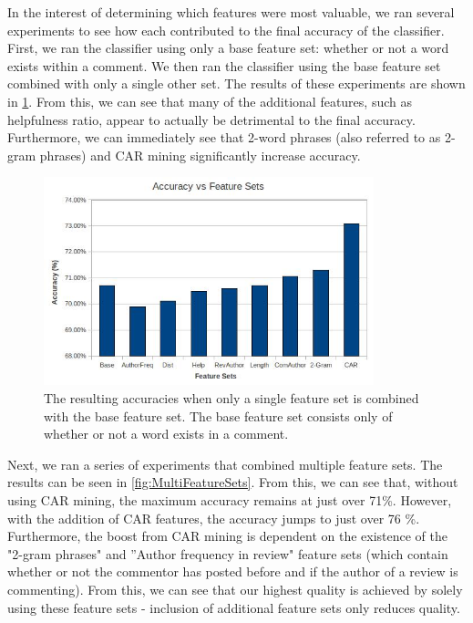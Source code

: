\documentclass[]{report}
\begin{document}
In the interest of determining which features were most valuable, we ran several experiments to see how each contributed to the final accuracy of the classifier.  First, we ran the classifier using only a base feature set: whether or not a word exists within a comment.  We then ran the classifier using the base feature set combined with only a single other set.  The results of these experiments are shown in \ref{fig:MinimalFeatureSets}.  From this, we can see that many of the additional features, such as helpfulness ratio, appear to actually be detrimental to the final accuracy.  Furthermore, we can immediately see that 2-word phrases (also referred to as 2-gram phrases) and CAR mining significantly increase accuracy.
\begin{figure}[H]
\centering
\includegraphics[width=3.77in]{AccuracyVsFeatureSets.jpg}
\caption{The resulting accuracies when only a single feature set is combined with the base feature set.  The base feature set consists only of whether or not a word exists in a comment.}
\label{fig:MinimalFeatureSets}
\end{figure}

Next, we ran a series of experiments that combined multiple feature sets.  The results can be seen in \ref{fig:MultiFeatureSets}.  From this, we can see that, without using CAR mining, the maximum  accuracy remains at just over 71\%.  However, with the addition of CAR features, the accuracy jumps to just over 76 \%.  Furthermore, the boost from CAR mining is dependent on the existence of the "2-gram phrases" and ''Author frequency in review" feature sets (which contain whether or not the commentor has posted before and if the author of a review is commenting).  From this, we can see that our highest quality is achieved by solely using these feature sets - inclusion of additional feature sets only reduces quality.
\end{document}
